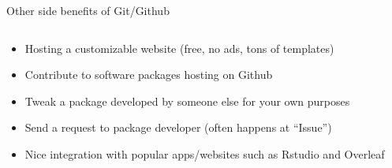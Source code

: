 \documentclass[handout,pdftex,10pt,aspectratio=169]{beamer}
\begin{document}
\begin{frame}{Other side benefits of Git/Github}
  \begin{columns}[c]
    \begin{column}{0.46\linewidth}
      \begin{itemize}\setlength\itemsep{10pt}
        \item<1-> Hosting a customizable website (free, no ads, tons of templates)
        \item<2-> Contribute to software packages hosting on Github
        \item<3-> Tweak a package developed by someone else for your own purposes
        \item<4-> Send a request to package developer (often happens at ``Issue'')
        \item<5-> Nice integration with popular apps/websites such as Rstudio and Overleaf 
      \end{itemize}
    \end{column}\hfill
    \begin{column}{0.53\linewidth}
      \centering

\end{column}
\end{columns}
\end{frame}
\end{document}
